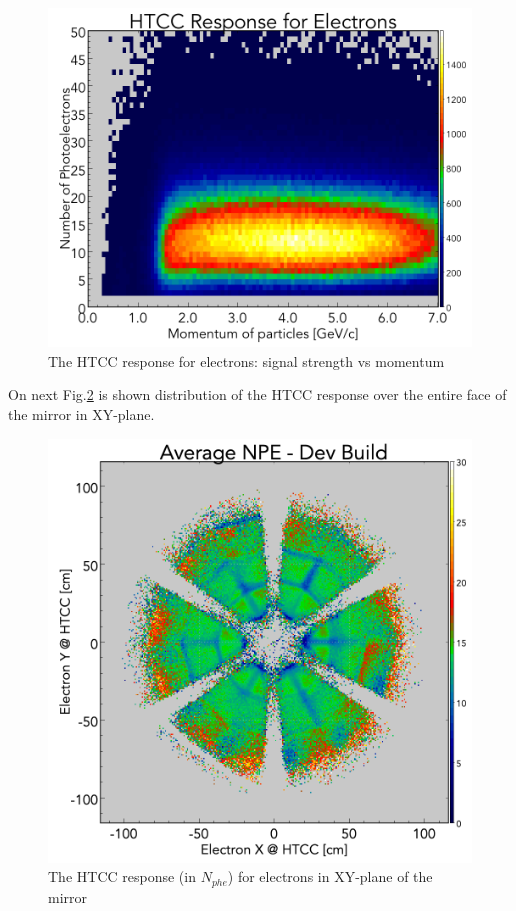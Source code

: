 \begin{figure}[!ht]
    \centering
    \includegraphics[width=1.0\linewidth,trim={0.0cm 0.0cm 0.0cm 1.73cm},clip]{images/HTCC_Response_run4013.png}
    \caption{The HTCC response for electrons: signal strength vs momentum}
    \label{fig:HTCC_Response_run4013}
\end{figure}
On next  Fig.\ref{fig:avgNPE_Theta_Phi_Dev_Build-2_NO_HOLES} is shown distribution of the HTCC response over the entire face of the mirror in XY-plane.
\begin{figure}[!ht]
    \centering
    \includegraphics[width=1.0\linewidth,trim={0.0cm 0.0cm 0.0cm 1.67cm},clip]{images/avgNPE_Theta_Phi_Dev_Build-2_NO_HOLES.png}
    \caption{The HTCC response (in $N_{phe}$) for electrons in XY-plane of the mirror}
    \label{fig:avgNPE_Theta_Phi_Dev_Build-2_NO_HOLES}
\end{figure}
